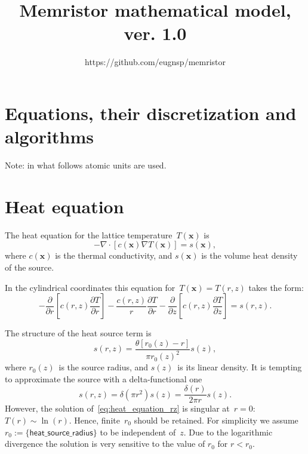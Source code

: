 \documentclass[10pt]{article}
\renewcommand{\vec}[1]{\mathbf{#1}}
\newcommand{\vx}{\vec{x}}
\begin{document}
\title{Memristor mathematical model, ver. 1.0}
\author{https://github.com/eugnsp/memristor}
\maketitle

\section*{Equations, their discretization and algorithms}

Note: in what follows atomic units are used.

\section*{Heat equation}

The heat equation for the lattice temperature~$T(\vx)$ is
\begin{equation}
-\nabla \cdot [ c(\vx) \nabla T(\vx) ] = s(\vx),
\end{equation}
where $c(\vx)$ is the thermal conductivity, and $s(\vx)$ is the volume heat
density of the source.

In the cylindrical coordinates this equation for~$T(\vx) = T(r, z)$ takes the form:
\begin{equation}
\label{eq:heat_equation_rz}
- \frac{\partial}{\partial r} \left[ c(r, z) \frac{\partial T}{\partial r} \right]
- \frac{c(r, z)}{r} \frac{\partial T}{\partial r}
- \frac{\partial}{\partial z} \left[ c(r, z) \frac{\partial T}{\partial z} \right]
= s(r, z).
\end{equation}

The structure of the heat source term is
\begin{equation}
s(r, z) = \frac{\theta [ r_0(z) - r ]}{\pi r_0(z)^2} s(z),
\end{equation}
where $r_0(z)$~is the source radius, and $s(z)$~is its linear density. It is
tempting to approximate the source with a delta-functional one
\begin{equation}
s(r, z) = \delta (\pi r^2) s(z) = \frac{\delta(r)}{2\pi r} s(z).
\end{equation}
However, the solution of~\eqref{eq:heat_equation_rz} is singular at~$r = 0$:
$T(r) \sim \ln(r)$. Hence, finite~$r_0$ should be retained. For simplicity we
assume $r_0 := \{ \mathsf{heat\_source\_radius} \}$ to be independent of~$z$.
Due to the logarithmic divergence the solution is very sensitive to the value
of $r_0$ for $r < r_0$.
\end{document}
